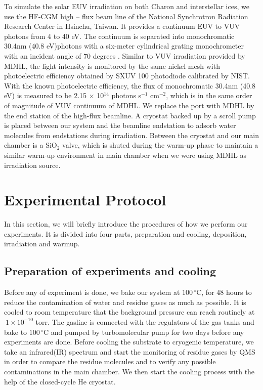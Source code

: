 To simulate the solar EUV irradiation on both Charon and interstellar ices, we use the HF-CGM high – flux beam line of the National Synchrotron Radiation Research Center in Hsinchu, Taiwan. It provides a continuum EUV to VUV photons from 4 to 40 eV. The continuum is separated into monochromatic 30.4nm (40.8 eV)photons with a six-meter cylindrical grating monochrometer with an incident angle of 70 degrees \cite{hsieh1998design}. Similar to VUV irradiation provided by MDHL, the light intensity is monitored by the same nickel mesh with photoelectric efficiency obtained by SXUV 100 photodiode calibrated by NIST. With the known photoelectric efficiency, the flux of monochromatic 30.4nm (40.8 eV) is measured to be 2.15 $\times$ 10$^{14}$ photons s$^{-1}$ cm$^{-2}$, which is in the same order of magnitude of VUV continuum of MDHL. We replace the port with MDHL by the end station of the high-flux beamline. A cryostat backed up by a scroll pump is placed between our system and the beamline endstation to adsorb water molecules from endstations during irradiation. Between the cryostat and our main chamber is a SiO$_2$ valve, which is shuted during the warm-up phase to maintain a similar warm-up environment in main chamber when we were using MDHL as irradiation source.

\section{Experimental Protocol}
\label{sec:Experimental_Protocol}

In this section, we will briefly introduce the  procedures of how we perform our experiments. It is divided into four parts, preparation and cooling, deposition, irradiation and warmup.

\subsection{Preparation of experiments and cooling}
Before any of experiment is done, we bake our system at $100 \,^{\circ}\mathrm{C}$, for 48 hours to reduce the contamination of water and residue gases as much as possible. It is cooled to room temperature that the background pressure can reach routinely at $~ 1 \times 10^{-10}$ torr. The gasline is connected with the regulators of the gas tanks and bake to $100\,^{\circ}\mathrm{C}$ and pumped by turbomolecular pump for two days before any experiments are done. Before cooling the substrate to cryogenic temperature, we take an infrared(IR) spectrum and start the monitoring of residue gases by QMS in order to compare the residue molecules and to verify any possible contaminations in the main chamber. We then start the cooling process with the help of the closed-cycle He cryostat.

